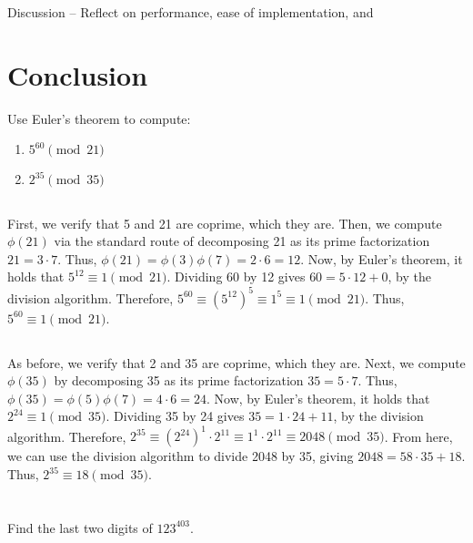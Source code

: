 \documentclass{article}
\begin{document}
Discussion – Reflect on performance, ease of implementation, and 

\section{Conclusion}

\newpage

Use Euler's theorem to compute:

\begin{enumerate}
    \item $5^{60} \pmod{21}$
    \item $2^{35} \pmod{35}$
\end{enumerate}

\subsection{}

First, we verify that 5 and 21 are coprime, which they are. Then, we compute $\phi(21)$ via the standard route of decomposing 21 as its prime factorization $21 = 3\cdot 7$. Thus, $\phi(21) = \phi(3)\phi(7) = 2 \cdot 6 = 12$. Now, by Euler's theorem, it holds that $5^{12} \equiv 1 \pmod{21}$. Dividing 60 by 12 gives $60 = 5 \cdot 12 + 0$, by the division algorithm. Therefore, $5^{60} \equiv (5^{12})^5 \equiv 1^5 \equiv 1 \pmod{21}$. Thus, $5^{60} \equiv 1 \pmod{21}$.

\subsection{}

As before, we verify that 2 and 35 are coprime, which they are. Next, we compute $\phi(35)$ by decomposing 35 as its prime factorization $35 = 5 \cdot 7$. Thus, $\phi(35) = \phi(5)\phi(7) = 4 \cdot 6 = 24$. Now, by Euler's theorem, it holds that $2^{24} \equiv 1 \pmod{35}$. Dividing 35 by 24 gives $35 = 1 \cdot 24 + 11$, by the division algorithm. Therefore, $2^{35} \equiv (2^{24})^1 \cdot 2^{11} \equiv 1^1 \cdot 2^{11} \equiv 2048 \pmod{35}$. From here, we can use the division algorithm to divide 2048 by 35, giving $2048 = 58 \cdot 35 + 18$. Thus, $2^{35} \equiv 18 \pmod{35}$.

\section{}

Find the last two digits of $123^{403}$.
\end{document}
